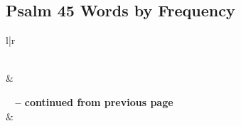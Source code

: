 

\subsection{Psalm 45 Words by Frequency}


\normalsize
 
\begin{center}
\begin{longtable}{l|r}
\caption[Psalm 45 Words by Frequency]{Psalm 45 Words by Frequency}\label{table:WordsbyFrequency for Psalm 45} \\
\hline {} &  \\ \hline 
\endfirsthead
 
{{\bfseries \tablename\ \thetable{} -- continued from previous page}} \\  
\hline {} &  \\ \hline 
\endhead
 

\end{longtable}
\end{center}
